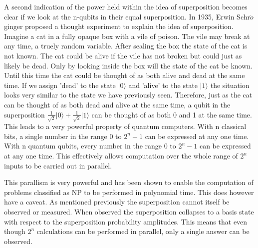 \documentclass[authoryearcitations]{UoYCSproject}
\begin{document}
A second indication of the power held within the idea of superposition becomes clear if we look at the n-qubits in their equal superposition.
In 1935, Erwin Schr$\ddot{o}$ginger proposed a thought experiment to explain the idea of superposition.
Imagine a cat in a fully opaque box with a vile of poison.
The vile may break at any time, a truely random variable.
After sealing the box the state of the cat is not known.
The cat could be alive if the vile has not broken but could just as likely be dead.
Only by looking inside the box will the state of the cat be known.
Until this time the cat could be thought of as both alive and dead at the same time.
If we assign 'dead' to the state $\vert0\rangle$ and 'alive' to the state $\vert1\rangle$ the situation looks very similar to the state we have previously seen.
Therefore, just as the cat can be thought of as both dead and alive at the same time, a qubit in the superposition $\frac{1}{\sqrt{2}}\vert0\rangle+\frac{1}{\sqrt{2}}\vert1\rangle$ can be thought of as both 0 and 1 at the same time.
This leads to a very powerful property of quantum computers.
With n classical bits, a single number in the range 0 to $2^n-1$ can be expressed at any one time.
With n quantum qubits, every number in the range 0 to $2^n-1$ can be expressed at any one time.
This effectively allows computation over the whole range of $2^n$ inputs to be carried out in parallel.

This parallism is very powerful and has been shown to enable the computation of problems classified as NP to be performed in polynomial time.
This does however have a caveat.
As mentioned previously the superposition cannot itself be observed or measured.
When observed the superposition collapses to a basis state with respect to the superposition probability amplitudes.
This means that even though $2^n$ calculations can be performed in parallel, only a single answer can be observed.
\end{document}
